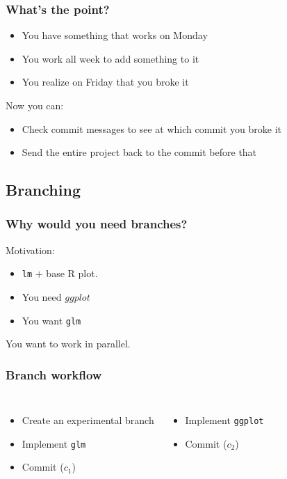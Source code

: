 \documentclass{beamer}
\begin{document}
\begin{frame}
    \frametitle{What's the point?}
    \begin{itemize}
        \item You have something that works on Monday
        \item You work all week to add something to it
        \item You realize on Friday that you broke it
    \end{itemize}
    Now you can: 
    \begin{itemize}
        \item Check commit messages to see at which commit you broke it
        \item Send the entire project back to the commit before that
    \end{itemize}
\end{frame} 

\subsection{Branching}
\begin{frame}[fragile]
    \frametitle{Why would you need branches?}
    Motivation:
    \begin{itemize}
        \item \verb|lm| $+$ base R plot. 
        \item You need $ggplot$
        \item You want \verb|glm|
    \end{itemize}
    You want to work in parallel. 
\end{frame}

\begin{frame}[fragile]
    \frametitle{Branch workflow}
    \begin{columns}
    \begin{itemize}
        \item Create an experimental branch
        \item Implement \verb|glm|
        \item Commit ($c_1$)
    \end{itemize}
    \begin{itemize}
        \item Implement \verb|ggplot|
        \item Commit ($c_2$)
    \end{itemize}
\end{columns}
\end{frame}
\end{document}
